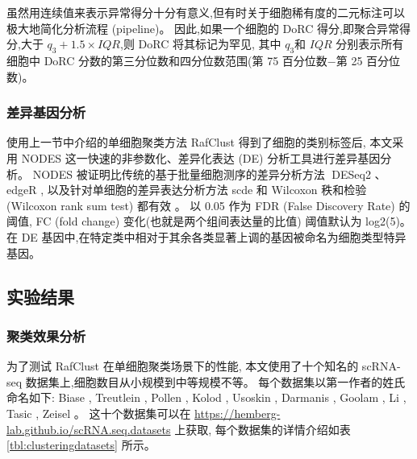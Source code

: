 虽然用连续值来表示异常得分十分有意义,但有时关于细胞稀有度的二元标注可以极大地简化分析流程 (pipeline)。
因此,如果一个细胞的 DoRC 得分,即聚合异常得分,大于 $q_3 + 1.5 \times IQR$,则 DoRC 将其标记为罕见,
其中 $q_3$和 $IQR$ 分别表示所有细胞中 DoRC 分数的第三分位数和四分位数范围(第 75 百分位数$-$第 25 百分位数)。

\subsubsection{差异基因分析}
\label{subsec:de}

使用上一节中介绍的单细胞聚类方法 RafClust 得到了细胞的类别标签后,
本文采用 NODES  这一快速的非参数化、差异化表达 (DE) 分析工具进行差异基因分析。
NODES 被证明比传统的基于批量细胞测序的差异分析方法 DESeq2 、edgeR ,
以及针对单细胞的差异表达分析方法 scde  和 Wilcoxon 秩和检验 (Wilcoxon rank sum test) 都有效 。
以 0.05 作为 FDR (False Discovery Rate) 的阈值, FC (fold change) 变化(也就是两个组间表达量的比值) 阈值默认为 log2(5)。
在 DE 基因中,在特定类中相对于其余各类显著上调的基因被命名为细胞类型特异基因。

\subsection{实验结果}

\subsubsection{聚类效果分析}

为了测试 RafClust 在单细胞聚类场景下的性能,
本文使用了十个知名的 scRNA-seq 数据集上,细胞数目从小规模到中等规模不等。
每个数据集以第一作者的姓氏命名如下: 
Biase ,
Treutlein , 
Pollen , 
Kolod , 
Usoskin , 
Darmanis , 
Goolam , 
Li ,
Tasic , 
Zeisel 。
这十个数据集可以在 \url{https://hemberg-lab.github.io/scRNA.seq.datasets} 上获取, 
每个数据集的详情介绍如表 \ref{tbl:clusteringdatasets} 所示。

